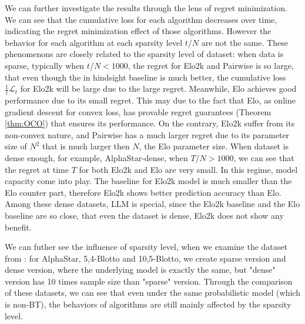 We can further investigate the results through the lens of regret minimization. We can see that the cumulative loss for each algorithm decreases over time, indicating the regret minimization effect of those algorithms. However the behavior for each algorithm at each sparsity level $t/N$ are not the same. These phenomenons are closely related to the sparsity level of dataset: when data is sparse, typically when $t/N<1000$, the regret for Elo2k and Pairwise is so large, that even though the in hindsight baseline is much better, the cumulative loss $\frac{1}{t}\mathcal{L}_{t}$ for Elo2k will be large due to the large regret. Meanwhile, Elo achieves good performance due to its small regret. This may due to the fact that Elo, as online gradient descent for convex loss, has provable regret guarantees (Theorem \ref{thm:OCO}) that ensures its performance. On the contrary, Elo2k suffer from its non-convex nature, and Pairwise has a much larger regret due to its parameter size of $N^{2}$ that is much larger then $N$, the Elo parameter size. When dataset is dense enough, for example, AlphaStar-dense, when $T/N >1000$, we can see that the regret at time $T$ for both Elo2k and Elo are very small. In this regime, model capacity come into play. The baseline for Elo2k model is much smaller than the Elo counter part, therefore Elo2k shows better prediction accuracy than Elo.  Among these dense datasets, LLM is special, since the Elo2k baseline and the Elo baseline are so close, that even the dataset is dense, Elo2k does not show any benefit.


We can futher see the influence of sparsity level, when we examine the dataset from \citet{czarnecki2020real}: for AlphaStar, 5,4-Blotto and 10,5-Blotto, we create sparse version and dense version, where the underlying model is exactly the same, but "dense" version has 10 times sample size than "sparse" version. Through the comparison of these datasets, we can see that even under the same probabilistic model (which is non-BT), the behaviors of algorithms are still mainly affected by the sparsity level. 
%